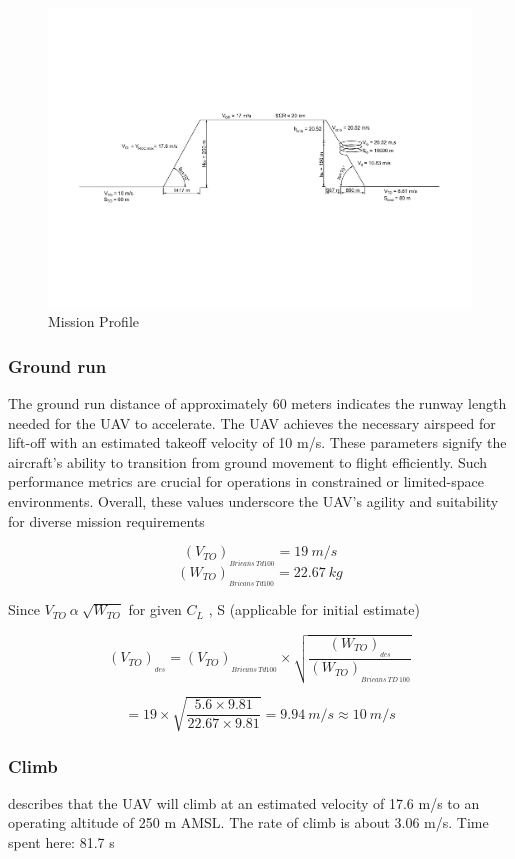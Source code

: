 \documentclass[12 pt]{article}
\begin{document}
\begin{figure}[h]
    \centering
    \includegraphics[width = \linewidth]{Drawing1-Model_final.pdf}
    \caption{Mission Profile}
    \label{Mission Profile}
\end{figure}


\subsubsection{{Ground run}}
The ground run distance of approximately 60 meters indicates the runway length needed for the UAV to accelerate. The UAV achieves the necessary airspeed for lift-off with an estimated takeoff velocity of 10 m/s. These parameters signify the aircraft's ability to transition from ground movement to flight efficiently. Such performance metrics are crucial for operations in constrained or limited-space environments. Overall, these values underscore the UAV's agility and suitability for diverse mission requirements \cite{EgglestonUnknownTitle2015}

$$ (V_{TO})_{_{Bricans \: Td100}} = 19 \: m/s$$
$$ (W_{TO})_{_{Bricans \: Td100}} = 22.67 \: kg$$

Since $ V_{TO} \: \alpha \: \sqrt{W_{TO}} $ for given $C_L$ , S (applicable for initial estimate)

$$ (V_{TO})_{_{des}} = (V_{TO})_{_{Bricans \: Td100}} \times \sqrt{\frac{(W_{TO})_{_{des}}}{(W_{TO})_{_{Bricans \: TD \: 100}}}} $$

$$ = 19 \times \sqrt{\frac{5.6 \times 9.81}{22.67 \times 9.81}} = 9.94 \: m/s \approx 10 \: m/s $$

\subsubsection{{Climb}} 
\cite{1000_questions}describes that the UAV will climb at an estimated velocity of 17.6 m/s to an operating altitude of 250 m AMSL. The rate of climb is about 3.06 m/s. Time spent here: 81.7 s
\end{document}
